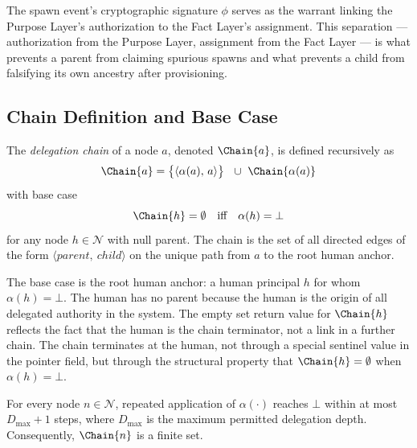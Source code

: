 The spawn event's cryptographic signature $\phi$ serves as the warrant linking the Purpose Layer's authorization to the Fact Layer's assignment. This separation — authorization from the Purpose Layer, assignment from the Fact Layer — is what prevents a parent from claiming spurious spawns and what prevents a child from falsifying its own ancestry after provisioning.

\subsection{Chain Definition and Base Case}
\label{sec:chain-definition}

\begin{dfn}
\label{dfn:delegation-chain}
The \emph{delegation chain} of a node $a$, denoted $\Chain{a}$, is defined recursively as
\begin{equation}
\Chain{a} = \bigl\{\langle \alpha(a),\, a\rangle\bigr\}\ \ \cup\ \Chain{\alpha(a)}
\label{eq:chain-definition}
\end{equation}
with base case
\begin{equation}
\Chain{h} = \emptyset \quad \text{iff} \quad \alpha(h) = \bot
\label{eq:chain-base-case}
\end{equation}
for any node $h \in \mathcal{N}$ with null parent. The chain is the set of all directed edges of the form $\langle parent,\ child\rangle$ on the unique path from $a$ to the root human anchor.
\end{dfn}

The base case is the root human anchor: a human principal $h$ for whom $\alpha(h) = \bot$. The human has no parent because the human is the origin of all delegated authority in the system. The empty set return value for $\Chain{h}$ reflects the fact that the human is the chain terminator, not a link in a further chain. The chain terminates at the human, not through a special sentinel value in the pointer field, but through the structural property that $\Chain{h} = \emptyset$ when $\alpha(h) = \bot$.

\begin{prop}
\label{prop:chain-terminates-at-human}
For every node $n \in \mathcal{N}$, repeated application of $\alpha(\cdot)$ reaches $\bot$ within at most $D_{\max} + 1$ steps, where $D_{\max}$ is the maximum permitted delegation depth. Consequently, $\Chain{n}$ is a finite set.
\end{prop}

